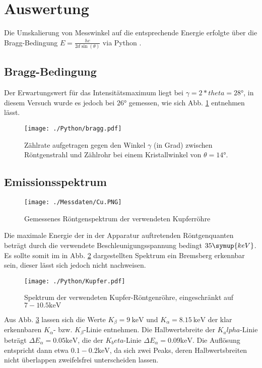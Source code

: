 \section{Auswertung}
\label{sec:Auswertung}
Die Umskalierung von Messwinkel auf die entsprechende Energie erfolgte über die Bragg-Bedingung $E = \frac{hc}{2d\sin(\theta)}$ via Python \cite{matplotlib} \cite{numpy} \cite{uncertainties}.

\subsection{Bragg-Bedingung}
\label{sec:bragg}

Der Erwartungswert für das Intensitätsmaximum liegt bei $\gamma = 2*theta = 28\si{\degree} $, in diesem Versuch wurde es jedoch bei $26\si{\degree}$ gemessen, wie sich Abb. \ref{fig:bragg} entnehmen lässt.

\begin{figure}
  \centering
  \texttt{[image: ./Python/bragg.pdf]}
  \caption{Zählrate aufgetragen gegen den Winkel $\gamma$ (in Grad) zwischen Röntgenstrahl und Zählrohr bei einem Kristallwinkel von $\theta = 14 \si{\degree}$.}
  \label{fig:bragg}
\end{figure}

\subsection{Emissionsspektrum}
\label{sec:emission}

\begin{figure}
  \centering
  \texttt{[image: ./Messdaten/Cu.PNG]}
  \caption{Gemessenes Röntgenspektrum der verwendeten Kupferröhre}
  \label{fig:brems}
\end{figure}

Die maximale Energie der in der Apparatur auftretenden Röntgenquanten beträgt durch die verwendete Beschleunigungsspannung bedingt $35\symup{keV}$. Es sollte somit im in Abb. \ref{fig:brems} dargestellten Spektrum ein Bremsberg erkennbar sein, dieser lässt sich jedoch nicht nachweisen.

\begin{figure}
  \centering
  \texttt{[image: ./Python/Kupfer.pdf]}
  \caption{Spektrum der verwendeten Kupfer-Röntgenröhre, eingeschränkt auf $7-10.5 \si{\kilo \electronvolt}$}
  \label{fig:klinie}
\end{figure}

Aus Abb. \ref{fig:klinie} lassen sich die Werte $K_\beta = \SI{9}{\kilo \electronvolt}$ und $K_\alpha = \SI{8.15}{\kilo \electronvolt}$ der klar erkennbaren $K_\alpha$- bzw. $K_\beta$-Linie entnehmen. Die Halbwertsbreite der $K_alpha$-Linie beträgt $\Delta E_\alpha = 0.05 \si{\kilo \electronvolt}$, die der $K_beta$-Linie $\Delta E_\alpha = 0.09 \si{\kilo \electronvolt}$. Die Auflösung entspricht dann etwa $0.1-0.2 \si{\kilo \electronvolt}$, da sich zwei Peaks, deren Halbwertsbreiten nicht überlappen zweifelsfrei unterscheiden lassen.


